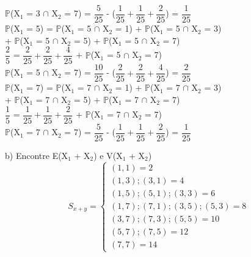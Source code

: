 \documentclass[12pt,a4paper,draft,final,oneside]{article}
\begin{document}
\begin{center}
		$\mathbb{P}$(X$_{1}$ = 3 $\cap$ X$_{2}$ = 7) = $\dfrac{5}{25}$ - ($\dfrac{1}{25} + \dfrac{1}{25} + \dfrac{2}{25}$) = $\dfrac{1}{25}$
		\vspace{1cm}\\
		$\mathbb{P}$(X$_{1}$ = 5) = $\mathbb{P}$(X$_{1}$ = 5 $\cap$ X$_{2}$ = 1) + $\mathbb{P}$(X$_{1}$ = 5 $\cap$ X$_{2}$ = 3)\\
		+ $\mathbb{P}$(X$_{1}$ = 5 $\cap$ X$_{2}$ = 5) + $\mathbb{P}$(X$_{1}$ = 5 $\cap$ X$_{2}$ = 7)
		\vspace{0.25cm}\\
		$\dfrac{2}{5}$ = $\dfrac{2}{25} + \dfrac{2}{25} + \dfrac{4}{25}$ + $\mathbb{P}$(X$_{1}$ = 5 $\cap$ X$_{2}$ = 7)
		\vspace{0.25cm}\\
		$\mathbb{P}$(X$_{1}$ = 5 $\cap$ X$_{2}$ = 7) = $\dfrac{10}{25}$ - ($\dfrac{2}{25} + \dfrac{2}{25} + \dfrac{4}{25}$) = $\dfrac{2}{25}$
		\vspace{1cm}\\
		$\mathbb{P}$(X$_{1}$ = 7) = $\mathbb{P}$(X$_{1}$ = 7 $\cap$ X$_{2}$ = 1) + $\mathbb{P}$(X$_{1}$ = 7 $\cap$ X$_{2}$ = 3)\\
		+ $\mathbb{P}$(X$_{1}$ = 7 $\cap$ X$_{2}$ = 5) + $\mathbb{P}$(X$_{1}$ = 7 $\cap$ X$_{2}$ = 7)
		\vspace{0.25cm}\\
		$\dfrac{1}{5}$ = $\dfrac{1}{25} + \dfrac{1}{25} + \dfrac{2}{25}$ + $\mathbb{P}$(X$_{1}$ = 7 $\cap$ X$_{2}$ = 7)
		\vspace{0.25cm}\\
		$\mathbb{P}$(X$_{1}$ = 7 $\cap$ X$_{2}$ = 7) = $\dfrac{5}{25}$ - ($\dfrac{1}{25} + \dfrac{1}{25} + \dfrac{2}{25}$) = $\dfrac{1}{25}$
	\end{center}
	\vspace{1cm}
	b) Encontre E(X$_{1}$ + X$_{2}$) e V(X$_{1}$ + X$_{2}$)
	\vspace{0.5cm}
		\[
	S_{x+y} =
	\begin{cases}
	(1, 1) = 2 \\
	(1, 3); (3, 1) = 4\\
	(1, 5); (5, 1); (3, 3) = 6\\
	(1, 7); (7, 1); (3, 5); (5, 3) = 8\\
	(3,7); (7, 3); (5,5) = 10\\
	(5, 7); (7,5) = 12\\
	(7, 7) = 14
	\end{cases}
	\]
\end{document}
